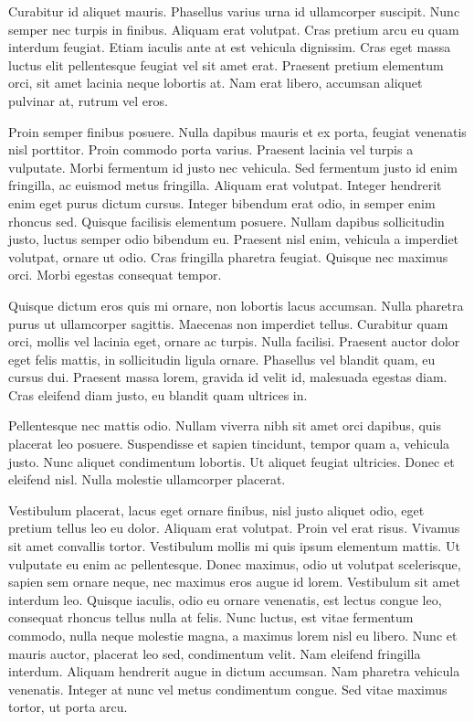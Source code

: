 \documentclass{article}
\begin{document}
	Curabitur id aliquet mauris. Phasellus varius urna id ullamcorper suscipit. Nunc semper nec turpis in finibus. Aliquam erat volutpat. Cras pretium arcu eu quam interdum feugiat. Etiam iaculis ante at est vehicula dignissim. Cras eget massa luctus elit pellentesque feugiat vel sit amet erat. Praesent pretium elementum orci, sit amet lacinia neque lobortis at. Nam erat libero, accumsan aliquet pulvinar at, rutrum vel eros.
	
	Proin semper finibus posuere. Nulla dapibus mauris et ex porta, feugiat venenatis nisl porttitor. Proin commodo porta varius. Praesent lacinia vel turpis a vulputate. Morbi fermentum id justo nec vehicula. Sed fermentum justo id enim fringilla, ac euismod metus fringilla. Aliquam erat volutpat. Integer hendrerit enim eget purus dictum cursus. Integer bibendum erat odio, in semper enim rhoncus sed. Quisque facilisis elementum posuere. Nullam dapibus sollicitudin justo, luctus semper odio bibendum eu. Praesent nisl enim, vehicula a imperdiet volutpat, ornare ut odio. Cras fringilla pharetra feugiat. Quisque nec maximus orci. Morbi egestas consequat tempor.
	
	Quisque dictum eros quis mi ornare, non lobortis lacus accumsan. Nulla pharetra purus ut ullamcorper sagittis. Maecenas non imperdiet tellus. Curabitur quam orci, mollis vel lacinia eget, ornare ac turpis. Nulla facilisi. Praesent auctor dolor eget felis mattis, in sollicitudin ligula ornare. Phasellus vel blandit quam, eu cursus dui. Praesent massa lorem, gravida id velit id, malesuada egestas diam. Cras eleifend diam justo, eu blandit quam ultrices in.
	
	Pellentesque nec mattis odio. Nullam viverra nibh sit amet orci dapibus, quis placerat leo posuere. Suspendisse et sapien tincidunt, tempor quam a, vehicula justo. Nunc aliquet condimentum lobortis. Ut aliquet feugiat ultricies. Donec et eleifend nisl. Nulla molestie ullamcorper placerat.
	
	Vestibulum placerat, lacus eget ornare finibus, nisl justo aliquet odio, eget pretium tellus leo eu dolor. Aliquam erat volutpat. Proin vel erat risus. Vivamus sit amet convallis tortor. Vestibulum mollis mi quis ipsum elementum mattis. Ut vulputate eu enim ac pellentesque. Donec maximus, odio ut volutpat scelerisque, sapien sem ornare neque, nec maximus eros augue id lorem. Vestibulum sit amet interdum leo. Quisque iaculis, odio eu ornare venenatis, est lectus congue leo, consequat rhoncus tellus nulla at felis. Nunc luctus, est vitae fermentum commodo, nulla neque molestie magna, a maximus lorem nisl eu libero. Nunc et mauris auctor, placerat leo sed, condimentum velit. Nam eleifend fringilla interdum. Aliquam hendrerit augue in dictum accumsan. Nam pharetra vehicula venenatis. Integer at nunc vel metus condimentum congue. Sed vitae maximus tortor, ut porta arcu.
	
\end{document}
